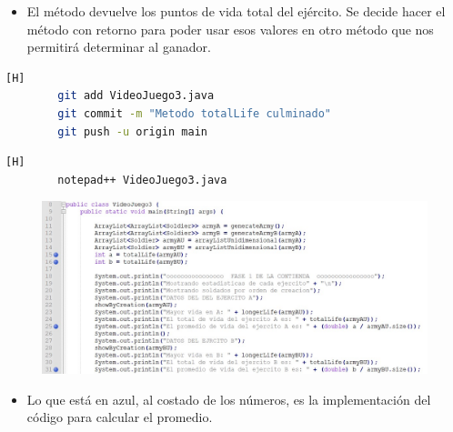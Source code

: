 \documentclass{article}
\begin{document}
	
	\begin{itemize}	
		\item El método devuelve los puntos de vida total del ejército. Se decide hacer el método con retorno para poder usar esos valores en otro método que nos permitirá determinar al ganador.
	\end{itemize}
	
	\begin{lstlisting}[language=bash,caption={Commit: Metodo totalLife culminado B}][H]
		git add VideoJuego3.java
		git commit -m "Metodo totalLife culminado"			
		git push -u origin main
	\end{lstlisting}	
	
	
	
	\begin{lstlisting}[language=bash,caption={Se implementa el código que calculará el promedio de vida de cada ejército}][H]
		notepad++ VideoJuego3.java
	\end{lstlisting}
	
	\begin{figure}[H]
		\centering
		\includegraphics[width=1.1\textwidth,keepaspectratio]{img/8.jpg}
	\end{figure}
	
	
	\begin{itemize}	
		\item Lo que está en azul, al costado de los números, es la implementación del código para calcular el promedio.
	\end{itemize}
	
\end{document}
